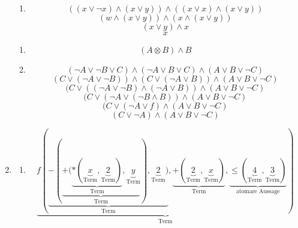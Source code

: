 \documentclass[a4paper]{article}
\begin{document}
\begin{enumerate}
\begin{enumerate}
			\item
			\begin{equation*}
				((x \lor \lnot x) \land (x \lor y)) \land ((x \lor x) \land (x \lor y))
			\end{equation*}
			\begin{equation*}
				(w \land (x \lor y)) \land (x \land (x \lor y))
			\end{equation*}
			\begin{equation*}
				(x \lor y) \land x
			\end{equation*}
			\begin{equation*}
				x
			\end{equation*}
		\end{enumerate}
		
		\begin{enumerate}
			\item
			\begin{equation*}
				(A \otimes B) \land B
			\end{equation*}
			
			\item
			\begin{equation*}
				(\lnot A \lor \lnot B \lor C) \land (\lnot A \lor B \lor C) \land (A \lor B \lor \lnot C)
			\end{equation*}
			\begin{equation*}
				(C \lor (\lnot A \lor \lnot B)) \land (C \lor (\lnot A \lor B)) \land (A \lor B \lor \lnot C)
			\end{equation*}
			\begin{equation*}
				(C \lor ((\lnot A \lor \lnot B) \land (\lnot A \lor B)) \land (A \lor B \lor \lnot C)
			\end{equation*}
			\begin{equation*}
				(C \lor (\lnot A \lor (\lnot B \land B)) \land (A \lor B \lor \lnot C)
			\end{equation*}
			\begin{equation*}
				(C \lor (\lnot A \lor f) \land (A \lor B \lor \lnot C)
			\end{equation*}
			\begin{equation*}
				(C \lor \lnot A) \land (A \lor B \lor \lnot C)
			\end{equation*}
		\end{enumerate}
		
		\item
		\begin{enumerate}
			\item
			\begin{equation*}
				\underbrace{f(\underbrace{-(\underbrace{+(\underbrace{*(\underbrace{x}_{\text{Term}}, \underbrace{2}_{\text{Term}})}_{\text{Term}}, \underbrace{y}_{\text{Term}}}_{\text{Term}}), \underbrace{2}_{\text{Term}})}_{\text{Term}}, \underbrace{+(\underbrace{2}_{\text{Term}}, \underbrace{x}_{\text{Term}})}_{\text{Term}}, \underbrace{\leq(\underbrace{4}_{\text{Term}}, \underbrace{3}_{\text{Term}})}_{\text{atomare Aussage}})}_{\text{Term}}
			\end{equation*}
			

\end{enumerate}
\end{enumerate}
\end{document}
